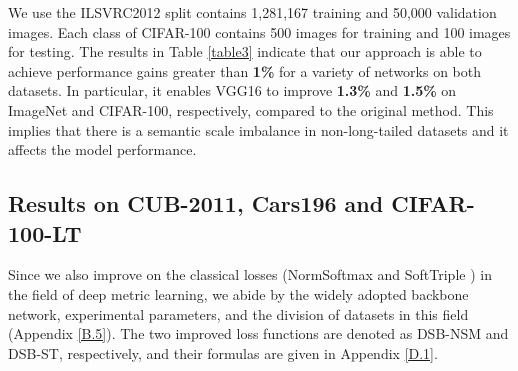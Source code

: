 \documentclass[10pt]{article} %
\begin{document}
We use the ILSVRC2012 split contains 1,281,167 training and 50,000 validation images. Each class of CIFAR-100 contains 500 images for training and 100 images for testing. The results in Table \ref{table3} indicate that our approach is able to achieve performance gains greater than \textbf{1\%} for a variety of networks on both datasets. In particular, it enables VGG16 to improve \textbf{1.3\%} and \textbf{1.5\%} on ImageNet and CIFAR-100, respectively, compared to the original method. This implies that there is a semantic scale imbalance in non-long-tailed datasets and it affects the model performance.


\subsection{Results on CUB-2011, Cars196 and CIFAR-100-LT\label{5.3}}
Since we also improve on the classical losses (NormSoftmax and SoftTriple \cite {paper82}) in the field of deep metric learning, we abide by the widely adopted backbone network, experimental parameters, and the division of datasets in this field (Appendix \ref{B.5}). The two improved loss functions are denoted as DSB-NSM and DSB-ST, respectively, and their formulas are given in Appendix \ref{D.1}.
\end{document}
